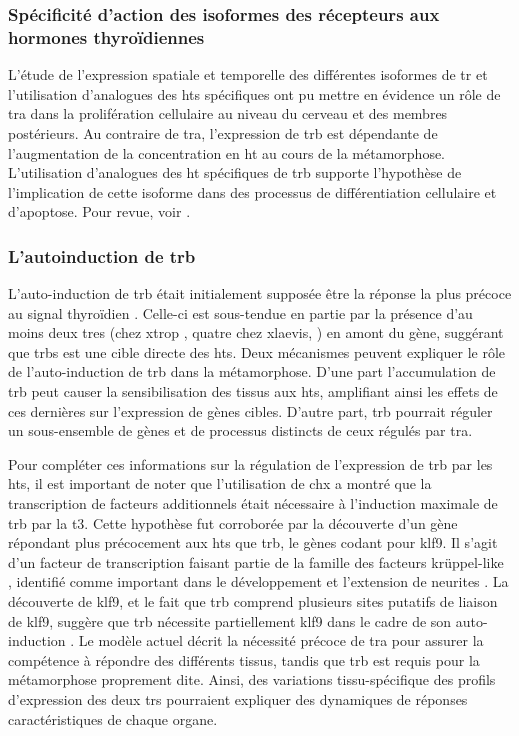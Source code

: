 \documentclass[../main.tex]{subfiles}
\begin{document}
\subsubsection{Spécificité d'action des isoformes des récepteurs aux hormones thyroïdiennes}
L'étude de l'expression spatiale et temporelle des différentes isoformes de \gls{tr} et l'utilisation d'analogues des \glspl{ht} spécifiques ont pu mettre en évidence un rôle de \gls{tra} dans la prolifération cellulaire au niveau du cerveau et des membres postérieurs.
Au contraire de \gls{tra}, l'expression de \gls{trb} est dépendante de l'augmentation de la concentration en \gls{ht} au cours de la métamorphose.
L'utilisation d'analogues des \gls{ht} spécifiques de \gls{trb} supporte l'hypothèse de l'implication de cette isoforme dans des processus de différentiation cellulaire et d'apoptose.
Pour revue, voir \citep{Furlow2006,Denver2009a}.

\subsubsection{L'autoinduction de \gls{trb}}
L'auto-induction de \gls{trb} était initialement supposée être la réponse la plus précoce au signal thyroïdien \citep{Yaoita1990}.
Celle-ci est sous-tendue en partie par la présence d'au moins deux \glspl{tre} (chez \gls{xtrop} \citealp{Bilesimo2011}, quatre chez \gls{xlaevis}, \citealp{Ranjan1994,Machuca1995,Urnov2001}) en amont du gène, suggérant que \glspl{trb} est une cible directe des \glspl{ht}.
Deux mécanismes peuvent expliquer le rôle de l'auto-induction de \gls{trb} dans la métamorphose.
D'une part l'accumulation de \gls{trb} peut causer la sensibilisation des tissus aux \glspl{ht}, amplifiant ainsi les effets de ces dernières sur l'expression de gènes cibles.
D'autre part, \gls{trb} pourrait réguler un sous-ensemble de gènes et de processus distincts de ceux régulés par \gls{tra}.
\par
Pour compléter ces informations sur la régulation de l'expression de \gls{trb} par les \glspl{ht}, il est important de noter que l'utilisation de \gls{chx} a montré que la transcription de facteurs additionnels était nécessaire à l'induction maximale de \gls{trb} par la \gls{t3}.
Cette hypothèse fut corroborée par la découverte d'un gène répondant plus précocement aux \glspl{ht} que \gls{trb}, le gènes codant pour \gls{klf9}.
Il s'agit d'un facteur de transcription faisant partie de la famille des facteurs krüppel-like \citep{Knoedler2014}, identifié comme important dans le développement et l'extension de neurites \citep{Scobie2009}.
La découverte de \gls{klf9}, et le fait que \gls{trb} comprend plusieurs sites putatifs de liaison de \gls{klf9}, suggère que \gls{trb} nécessite partiellement \gls{klf9} dans le cadre de son auto-induction \citep{Bagamasbad2008}.
Le modèle actuel décrit la nécessité précoce de \gls{tra} pour assurer la compétence à répondre des différents tissus, tandis que \gls{trb} est requis pour la métamorphose proprement dite.
Ainsi, des variations tissu-spécifique des profils d'expression des deux \glspl{tr} pourraient expliquer des dynamiques de réponses caractéristiques de chaque organe.
\end{document}
